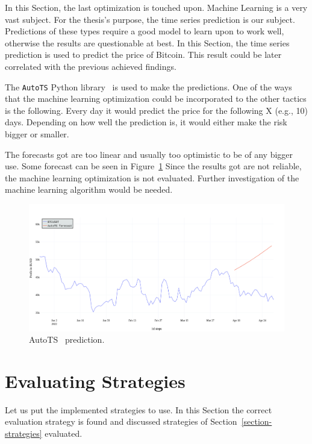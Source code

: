 In this Section, the last optimization is touched upon. Machine Learning is a very vast subject. For the thesis's purpose, the time series prediction is our subject. Predictions of these types require a good model to learn upon to work well, otherwise the results are questionable at best. In this Section, the time series prediction is used to predict the price of Bitcoin. This result could be later correlated with the previous achieved findings.

The \texttt{AutoTS} Python library~\cite{autots} is used to make the predictions. One of the ways that the machine learning optimization could be incorporated to the other tactics is the following. Every day it would predict the price for the following X (e.g., 10) days. Depending on how well the prediction is, it would either make the risk bigger or smaller.

The forecasts got are too linear and usually too optimistic to be of any bigger use. Some forecast can be seen in Figure~\ref{figure-autots-prediction}
Since the results got are not reliable, the machine learning optimization is not evaluated. Further investigation of the machine learning algorithm would be needed.

\begin{figure}[!t]
    \centering
    \includegraphics[width=\columnwidth]{figures/autots-prediction.png}
    \caption{AutoTS~\cite{autots} prediction.}
    \label{figure-autots-prediction}
\end{figure}

\section{Evaluating Strategies}
Let us put the implemented strategies to use. In this Section the correct evaluation strategy is found and discussed strategies of Section~\ref{section-strategies} evaluated.


